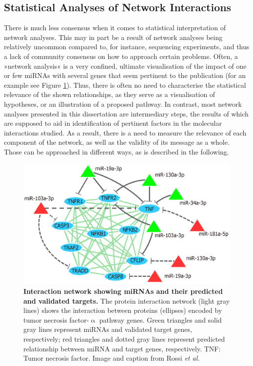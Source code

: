 \subsection{Statistical Analyses of Network Interactions} \label{sec:discussion:network-statistics}
There is much less consensus when it comes to statistical interpretation of network analyses. This may in part be a result of network analyses being relatively uncommon compared to, for instance, sequencing experiments, and thus a lack of community consensus on how to approach certain problems. Often, a »network analysis« is a very confined, ultimate visualisation of the impact of one or few miRNAs with several genes that seem pertinent to the publication (for an example see Figure \ref{fig:example-network}). Thus, there is often no need to characterise the statistical relevance of the shown relationships, as they serve as a visualisation of hypotheses, or an illustration of a proposed pathway. In contrast, most network analyses presented in this dissertation are intermediary steps, the results of which are supposed to aid in identification of pertinent factors in the molecular interactions studied. As a result, there is a need to measure the relevance of each component of the network, as well as the validity of its message as a whole. Those can be approached in different ways, as is described in the following.

\begin{figure}
\centering
\includegraphics[width=.6\textwidth]{figures/example-network}
\caption[miRNA-Interaction Network Example.]{\textbf{Interaction network showing miRNAs and their predicted and validated targets.} The protein interaction network (light gray lines) shows the interaction between proteins (ellipses) encoded by tumor necrosis factor-$\upalpha$ pathway genes. Green triangles and solid gray lines represent miRNAs and validated target genes, respectively; red triangles and dotted gray lines represent predicted relationship between miRNA and target genes, respectively. TNF: Tumor necrosis factor. Image and caption from Rossi \emph{et al.}\cite{Rossi2019}
\label{fig:example-network}}
\end{figure}

